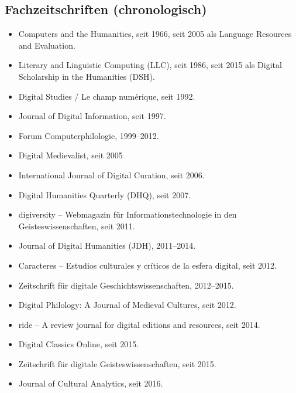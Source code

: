 \documentclass{article}
\begin{document}
\subsection{Fachzeitschriften (chronologisch)}
\begin{itemize}
\item Computers and the Humanities, seit 1966, seit 2005 als Language Resources and Evaluation.
\item Literary and Linguistic Computing (LLC), seit 1986, seit 2015 als Digital Scholarship in the Humanities (DSH).
\item Digital Studies / Le champ numérique, seit 1992.
\item Journal of Digital Information, seit 1997.
\item Forum Computerphilologie, 1999–2012.
\item Digital Medievalist, seit 2005
\item International Journal of Digital Curation, seit 2006.
\item Digital Humanities Quarterly (DHQ), seit 2007.
\item digiversity – Webmagazin für Informationstechnologie in den Geisteswissenschaften, seit 2011.
\item Journal of Digital Humanities (JDH), 2011–2014.
\item Caracteres – Estudios culturales y críticos de la esfera digital, seit 2012.
\item Zeitschrift für digitale Geschichtswissenschaften, 2012–2015.
\item Digital Philology: A Journal of Medieval Cultures, seit 2012.
\item ride – A review journal for digital editions and resources, seit 2014.
\item Digital Classics Online, seit 2015.
\item Zeitschrift für digitale Geisteswissenschaften, seit 2015.
\item Journal of Cultural Analytics, seit 2016.
\end{itemize}
\end{document}
